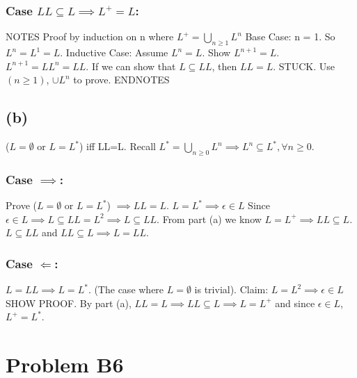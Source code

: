 \documentclass[12pt]{article}
\begin{document}
\subsubsection*{Case $LL \subseteq L \implies L^+ = L$:}
NOTES
\newline
Proof by induction on n where $L^+ = \bigcup\limits_{n\ge1} L^n$
Base Case: n = 1. So $L^n = L^1  = L$.
Inductive Case: Assume $L^n = L$.
Show $L^{n+1} =L$. 
\newline 
$L^{n+1} = LL^{n} = LL$. If we can show that $L \subseteq LL$, then 
$LL=L$.
STUCK. Use $(n \ge 1)$, $ \cup L^n$ to prove.
ENDNOTES

\subsection*{(b)}
($L=\emptyset$ or $L=L^*$) iff LL=L.
Recall $L^\ast = \bigcup\limits_{n \ge 0} L^n \implies L^n \subseteq L^\ast,
\forall n\ge 0$.
\newline
\subsubsection*{Case $\implies$:}
Prove ($L=\emptyset$ or $L=L^*$)
$\implies LL=L$. $L = L^\ast \implies {\epsilon } \in L$
Since ${\epsilon } \in L \implies L \subseteq LL = L^2 \implies L \subseteq LL$.
From part (a) we know $L=L^+ \implies LL \subseteq L$. 
$L \subseteq LL$ and $LL \subseteq L \implies L = LL$.

\subsubsection*{Case $\Longleftarrow$:} 
$L=LL \implies L = L^\ast$.
(The case where $L= \emptyset$ is trivial).
Claim: $L=L^2 \implies {\epsilon } \in L$ SHOW PROOF.
By part (a), $LL=L \implies LL \subseteq L \implies
L = L^+$ and since ${\epsilon } \in L$, $L^+=L^\ast$.

\section*{Problem B6}
\end{document}
